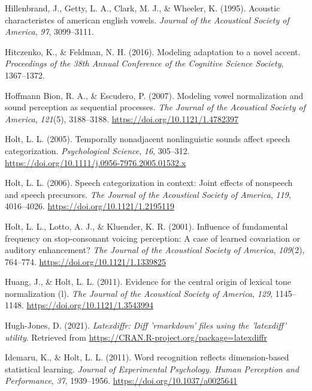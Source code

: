 \documentclass[
  11pt,
  english,
  man,floatsintext]{apa6}
\newlength{\cslhangindent}
\newlength{\cslentryspacingunit} %
\newenvironment{CSLReferences}[2] %
 {%
  \setlength{\parindent}{0pt}
  \ifodd #1
  \let\oldpar\par
  \def\par{\hangindent=\cslhangindent\oldpar}
  \fi
  \setlength{\parskip}{#2\cslentryspacingunit}
 }%
 {}
\begin{document}
\begin{CSLReferences}{1}{0}
\leavevmode{}%
Hillenbrand, J., Getty, L. A., Clark, M. J., \& Wheeler, K. (1995). Acoustic characteristcs of american english vowels. \emph{Journal of the Acoustical Society of America}, \emph{97}, 3099--3111.

\leavevmode{}%
Hitczenko, K., \& Feldman, N. H. (2016). Modeling adaptation to a novel accent. \emph{Proceedings of the 38th Annual Conference of the Cognitive Science Society}, 1367--1372.

\leavevmode{}%
Hoffmann Bion, R. A., \& Escudero, P. (2007). Modeling vowel normalization and sound perception as sequential processes. \emph{The Journal of the Acoustical Society of America}, \emph{121}(5), 3188--3188. \url{https://doi.org/10.1121/1.4782397}

\leavevmode{}%
Holt, L. L. (2005). Temporally nonadjacent nonlinguistic sounds affect speech categorization. \emph{Psychological Science}, \emph{16}, 305--312. \url{https://doi.org/10.1111/j.0956-7976.2005.01532.x}

\leavevmode{}%
Holt, L. L. (2006). Speech categorization in context: Joint effects of nonspeech and speech precursors. \emph{The Journal of the Acoustical Society of America}, \emph{119}, 4016--4026. \url{https://doi.org/10.1121/1.2195119}

\leavevmode{}%
Holt, L. L., Lotto, A. J., \& Kluender, K. R. (2001). Influence of fundamental frequency on stop-consonant voicing perception: A case of learned covariation or auditory enhancement? \emph{The Journal of the Acoustical Society of America}, \emph{109}(2), 764--774. \url{https://doi.org/10.1121/1.1339825}

\leavevmode{}%
Huang, J., \& Holt, L. L. (2011). Evidence for the central origin of lexical tone normalization (l). \emph{The Journal of the Acoustical Society of America}, \emph{129}, 1145--1148. \url{https://doi.org/10.1121/1.3543994}

\leavevmode{}%
Hugh-Jones, D. (2021). \emph{Latexdiffr: Diff 'rmarkdown' files using the 'latexdiff' utility}. Retrieved from \url{https://CRAN.R-project.org/package=latexdiffr}

\leavevmode{}%
Idemaru, K., \& Holt, L. L. (2011). Word recognition reflects dimension-based statistical learning. \emph{Journal of Experimental Psychology. Human Perception and Performance}, \emph{37}, 1939--1956. \url{https://doi.org/10.1037/a0025641}


\end{CSLReferences}
\end{document}
